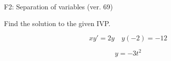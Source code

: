 \begin{exercise}
  \begin{exerciseTitle}F2: Separation of variables (ver. 69)\end{exerciseTitle}
  \begin{exerciseStatement}
    
Find the solution to the given IVP.

    
\[xy'= 2 y \hspace{1em} y( -2 ) = -12\]

  \end{exerciseStatement}
  \begin{exerciseAnswer}
    
\[y= -3 t^ 2\]

  \end{exerciseAnswer}
\end{exercise}